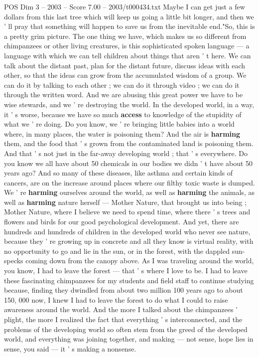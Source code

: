 \begin{textsample}{POS Dim 3 – 2003 – Score 7.00 – 2003/t000434.txt}
Maybe I can get just a few dollars from this last tree which will keep us going a little bit longer, and then we ' ll pray that something will happen to save us from the inevitable end."So, this is a pretty grim picture.
The one thing we have, which makes us so different from chimpanzees or other living creatures, is this sophisticated spoken language — a language with which we can tell children about things that aren ' t here.
We can talk about the distant past, plan for the distant future, discuss ideas with each other, so that the ideas can grow from the accumulated wisdom of a group.
We can do it by talking to each other ; we can do it through video ; we can do it through the written word.
And we are abusing this great power we have to be wise stewards, and we ' re destroying the world.
In the developed world, in a way, it ' s worse, because we have so much \textbf{access} to knowledge of the stupidity of what we ' re doing.
Do you know, we ' re bringing little babies into a world where, in many places, the water is poisoning them?
And the air is \textbf{harming} them, and the food that ' s grown from the contaminated land is poisoning them.
And that ' s not just in the far-away developing world ; that ' s everywhere.
Do you know we all have about 50 chemicals in our bodies we didn ' t have about 50 years ago?
And so many of these diseases, like asthma and certain kinds of cancers, are on the increase around places where our filthy toxic waste is dumped.
We ' re \textbf{harming} ourselves around the world, as well as \textbf{harming} the animals, as well as \textbf{harming} nature herself — Mother Nature, that brought us into being ; Mother Nature, where I believe we need to spend time, where there ' s trees and flowers and birds for our good psychological development.
And yet, there are hundreds and hundreds of children in the developed world who never see nature, because they ' re growing up in concrete and all they know is virtual reality, with no opportunity to go and lie in the sun, or in the forest, with the dappled sun-specks coming down from the canopy above.
As I was traveling around the world, you know, I had to leave the forest — that ' s where I love to be.
I had to leave these fascinating chimpanzees for my students and field staff to continue studying because, finding they dwindled from about two million 100 years ago to about 150, 000 now, I knew I had to leave the forest to do what I could to raise awareness around the world.
And the more I talked about the chimpanzees ' plight, the more I realized the fact that everything ' s interconnected, and the problems of the developing world so often stem from the greed of the developed world, and everything was joining together, and making — not sense, hope lies in sense, you said — it ' s making a nonsense.

\end{textsample}
